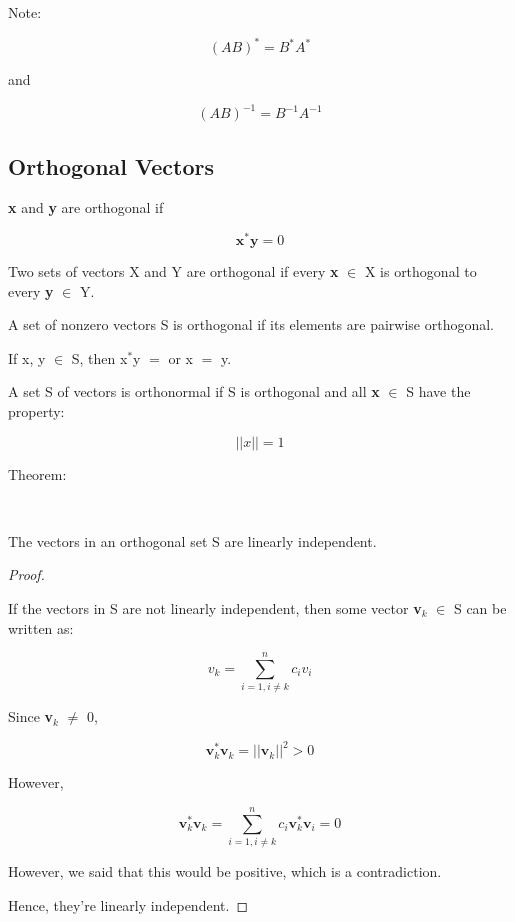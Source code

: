 \documentclass[12pt]{article}
\newcommand{\mt}[1]{\ensuremath{#1}}
\newcommand\ssc[2][\DefaultOpt]{%
  \def\DefaultOpt{#2}%
  \subsection[#1]{#2}%
}
\newcommand{\bgpf}{\begin{proof} $ $\newline}
\newcommand{\epf}{\end{proof}}
\newcommand{\mem}{\mt{\in} }
\newcommand{\eql}{\mt{=} }
\newcommand{\uw}[2]{#1\mt{_{#2}}}
\newcommand{\uf}[2]{#1\mt{^{#2}}}
\begin{document}
{Note:

\begin{displaymath}
  (AB)^* = B^* A^*
\end{displaymath}

and

\begin{displaymath}
  (AB)^{-1} = B^{-1} A^{-1}
\end{displaymath}

}

\ssc{Orthogonal Vectors}{

\textbf{x} and \textbf{y} are orthogonal if

\begin{displaymath}
  \textbf{x}^*\textbf{y} = 0
\end{displaymath}

Two sets of vectors X and Y are orthogonal if every \textbf{x} \mem X is orthogonal to every \textbf{y} \mem Y.

A set of nonzero vectors S is orthogonal if its elements are pairwise orthogonal.

If x, y \mem S, then \uf{x}{*}y \eql  or x \eql y.

A set S of vectors is orthonormal if S is orthogonal and all \textbf{x} \mem S have the property:

\begin{displaymath}
  ||x|| = 1
\end{displaymath}

Theorem:

\

The vectors in an orthogonal set S are linearly independent.

\bgpf

If the vectors in S are not linearly independent, then some vector \uw{\textbf{v}}{k} \mem S can be written as:

\begin{displaymath}
  v_k = \sum_{i = 1, i \neq k}^n c_i v_i
\end{displaymath}

Since \uw{\textbf{v}}{k} $\neq$ 0,

\begin{displaymath}
  \textbf{v}_k^* \textbf{v}_k = ||\textbf{v}_k||^2 > 0
\end{displaymath}

However,

\begin{displaymath}
  \textbf{v}_k^* \textbf{v}_k = \sum_{i = 1, i \neq k}^n c_i \textbf{v}_k^* \textbf{v}_i = 0
\end{displaymath}

However, we said that this would be positive, which is a contradiction.

Hence, they're linearly independent.

\epf 


}
\end{document}

